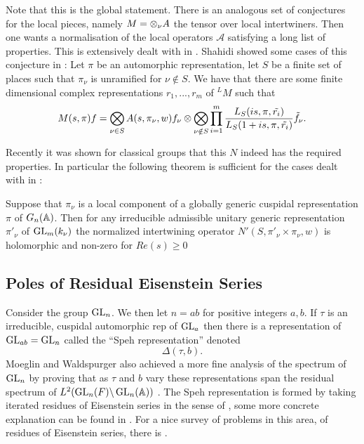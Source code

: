 Note that this is the global statement. There is an analogous set of conjectures for the local pieces, namely \(M = \otimes_\nu A\) the tensor over local intertwiners. Then one wants a normalisation of the local operators \(\mathscr{A}\) satisfying a long list of properties. This is extensively dealt with in \cite{shahidiProofLanglandsConjecture1990}. Shahidi showed some cases of this conjecture in \cite{shahidiRamanujanConjectureFiniteness1988a}: Let \(\pi\) be an automorphic representation, let \(S\) be a finite set of places such that \(\pi_\nu\) is unramified for \(\nu\notin S\). We have that there are some finite dimensional complex representations \(r_1, ..., r_m\) of \(^LM\) such that 
\[M(s, \pi)f = \bigotimes_{\nu\in S}A(s, \pi_\nu, w)f_\nu \otimes \bigotimes_{\nu\notin S} \prod_{i=1}^{m}\frac{L_S(is, \pi, \tilde{r_i})}{L_S(1+is, \pi, \tilde{r_i})} \tilde{f}_\nu.\]

Recently it was shown for classical groups that this \(N\) indeed has the required properties. In particular the following theorem is sufficient for the cases dealt with in \cite{jiangPolesCertainResidual2013}:
\begin{Theorem}
	Suppose that \(\pi_\nu\) is a local component of a globally generic cuspidal representation \(\pi\) of \(G_n(\A)\). Then for any irreducible admissible unitary generic representation \(\pi'_\nu\) of \(\operatorname{GL}_m(k_\nu)\) the normalized intertwining operator \(N'(S, \pi'_\nu\times \pi_\nu, w)\) is holomorphic and non-zero for \(Re(s)\geq 0\)
\end{Theorem}

\subsection{Poles of Residual Eisenstein Series}
Consider the group \(\operatorname{GL}_n\). We then let \(n = ab\) for positive integers \(a,b\). If \(\tau\) is an irreducible, cuspidal automorphic rep of \(\operatorname{GL}_a\) then there is a representation of \(\operatorname{GL}_{ab} = \operatorname{GL}_n\) called the ``Speh representation'' denoted 
\[\Delta(\tau, b).\]
Moeglin and Waldspurger also achieved a more fine analysis of the spectrum of \(\operatorname{GL}_n\) by proving that as \(\tau\) and \(b\) vary these representations span the residual spectrum of \(L^2(\GL_n(F) \backslash \GL_n(\A))\) \cite[Thm. 1.1]{jiangPolesCertainResidual2013}. The Speh representation is formed by taking iterated residues of Eisenstein series in the sense of \cite[V]{moeglinSpectralDecompositionEisenstein1995}, some more concrete explanation can be found in \cite[2.4]{brennerNotesAnalyticProperties2009}. For a nice survey of problems in this area, of residues of Eisenstein series, there is \cite{jiangResiduesEisensteinSeries2008a}.

